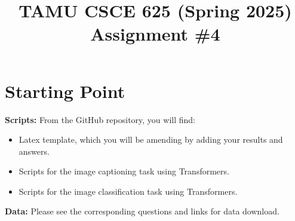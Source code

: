 \documentclass{article}
\title{TAMU CSCE 625 (Spring 2025) \\ Assignment \#4}
\date{}
\begin{document}
\maketitle



\section{Starting Point}


\textbf{Scripts:} From the GitHub repository, you will find:

\begin{itemize}
    \item Latex template, which you will be amending by adding your results and answers.

    \item Scripts for the image captioning task using Transformers.

    \item Scripts for the image classification task using Transformers.

\end{itemize}

\noindent \textbf{Data:} Please see the corresponding questions and links for data download.

\vspace{3mm}
\end{document}

